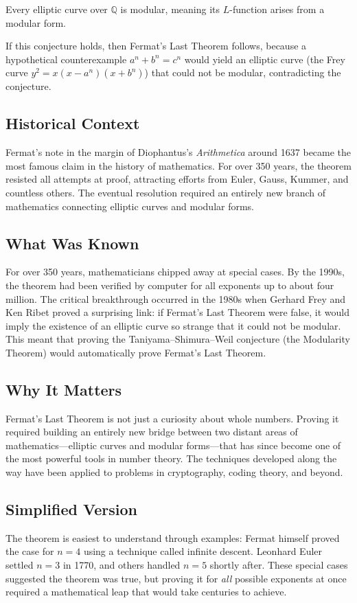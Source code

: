 \begin{conjecture}
Every elliptic curve over $\mathbb{Q}$ is modular, meaning its $L$-function arises from a modular form.
\end{conjecture}

If this conjecture holds, then Fermat's Last Theorem follows, because a hypothetical counterexample $a^n + b^n = c^n$ would yield an elliptic curve (the Frey curve $y^2 = x(x - a^n)(x + b^n)$) that could not be modular, contradicting the conjecture.

\subsection{Historical Context}
Fermat's note in the margin of Diophantus's \emph{Arithmetica} around 1637 became the most famous claim in the history of mathematics. For over 350 years, the theorem resisted all attempts at proof, attracting efforts from Euler, Gauss, Kummer, and countless others. The eventual resolution required an entirely new branch of mathematics connecting elliptic curves and modular forms.

\subsection{What Was Known}
For over 350 years, mathematicians chipped away at special cases. By the 1990s, the theorem had been verified by computer for all exponents up to about four million. The critical breakthrough occurred in the 1980s when Gerhard Frey and Ken Ribet proved a surprising link: if Fermat's Last Theorem were false, it would imply the existence of an elliptic curve so strange that it could not be modular. This meant that proving the Taniyama--Shimura--Weil conjecture (the Modularity Theorem) would automatically prove Fermat's Last Theorem.

\subsection{Why It Matters}
Fermat's Last Theorem is not just a curiosity about whole numbers. Proving it required building an entirely new bridge between two distant areas of mathematics---elliptic curves and modular forms---that has since become one of the most powerful tools in number theory. The techniques developed along the way have been applied to problems in cryptography, coding theory, and beyond.

\subsection{Simplified Version}
The theorem is easiest to understand through examples: Fermat himself proved the case for $n=4$ using a technique called infinite descent. Leonhard Euler settled $n=3$ in 1770, and others handled $n=5$ shortly after. These special cases suggested the theorem was true, but proving it for \emph{all} possible exponents at once required a mathematical leap that would take centuries to achieve.

